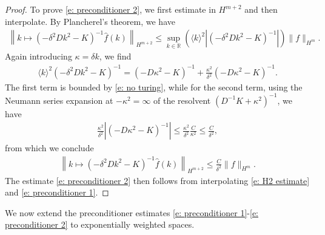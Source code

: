 \documentclass[11pt]{article}
\newcommand{\R}{\mathbb{R}}
\numberwithin{equation}{section}
\numberwithin{prop}{section}
\begin{document}
\begin{proof}
	To prove \eqref{e: preconditioner 2}, we first estimate in $H^{m+2}$ and then interpolate. By Plancherel's theorem, we have
	\begin{align*}
		\left\| k \mapsto (-\delta^2 D k^2 - K)^{-1} \hat{f} (k) \right\|_{H^{m+2}} \leq \sup_{k \in \R} \left( \langle k \rangle^2 | (-\delta^2 D k^2 - K)^{-1}| \right) \| f \|_{H^m}. 
	\end{align*}
	Again introducing $\kappa = \delta k$, we find
	\begin{align*}
		\langle k \rangle^2 (-\delta^2 D k^2 - K)^{-1} = (-D \kappa^2 - K)^{-1} + \frac{\kappa^2}{\delta^2} (- D\kappa^2 - K)^{-1}. 
	\end{align*}
	The first term is bounded by \eqref{e: no turing}, while for the second term, using the Neumann series expansion at $ -\kappa^2 =\infty$ of the resolvent $(D^{-1} K + \kappa^2)^{-1}$, we have
	\begin{align}
		\frac{\kappa^2}{\delta^2} |(- D\kappa^2 - K)^{-1}| \leq \frac  {\kappa^2}{\delta^2} \frac{C}{\kappa^2} \leq \frac{C}{\delta^2},
	\end{align}
	from which we conclude
	\begin{align}
		\left\| k \mapsto (-\delta^2 D k^2 - K)^{-1} \hat{f} (k) \right\|_{H^{m+2}} \leq \frac{C}{\delta^2} \| f \|_{H^m}. \label{e: H2 estimate}
	\end{align}
	The estimate \eqref{e: preconditioner 2} then follows from interpolating \eqref{e: H2 estimate} and \eqref{e: preconditioner 1}. 
\end{proof}

We now extend the preconditioner estimates \eqref{e: preconditioner 1}-\eqref{e: preconditioner 2} to exponentially weighted spaces. 
\end{document}
